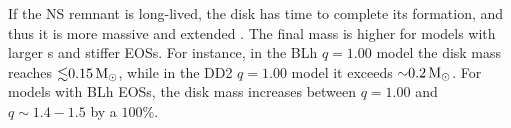 If the \ac{NS} remnant is long-lived, the disk has time to complete its formation,
and thus it is more massive and extended \citep{Perego:2019adq}. 
The final mass is higher for models with larger \mr{}s and stiffer \acp{EOS}.
For instance, 
in the BLh $q=1.00$ model
the disk mass reaches ${\lesssim}0.15\,{\text{M}_{\odot}}$, while in the 
DD2 $q=1.00$ model 
it exceeds ${\sim}0.2\,{\text{M}_{\odot}}$. For models with BLh \acp{EOS}, 
the disk mass increases between $q=1.00$ and $q\sim1.4-1.5$ by a $100\%$.


